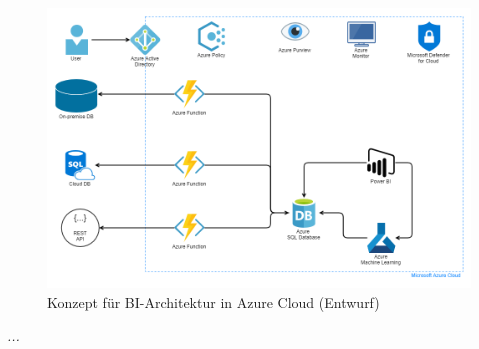 \begin{figure}[htbp]
 \centering
 \includegraphics[width=\textwidth]{gfx/chap03_konzept_architektur.png}
 \caption{Konzept für BI-Architektur in Azure Cloud (Entwurf)}
\label{fig:chap03_4_konzeptArchitektur}
\end{figure}

\textit{...}